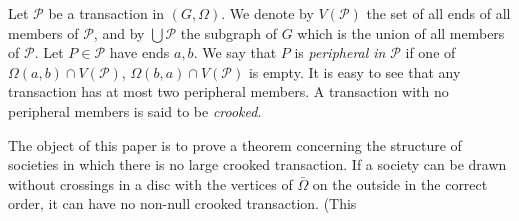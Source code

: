 Let $\mathcal{P}$ be a transaction in $(G, \Omega)$. We denote by $V(\mathcal{P})$ the set of all ends of all members of $\mathcal{P}$, and by $\bigcup \mathcal{P}$ the subgraph of $G$ which is the union of all members of $\mathcal{P}$. Let $P \in \mathcal{P}$ have ends $a, b$. We say that $P$ is \textit{peripheral in} $\mathcal{P}$ if one of $\Omega(a, b) \cap V(\mathcal{P})$, $\Omega(b, a) \cap V(\mathcal{P})$ is empty. It is easy to see that any transaction has at most two peripheral members. A transaction with no peripheral members is said to be \textit{crooked}.

The object of this paper is to prove a theorem concerning the structure of societies in which there is no large crooked transaction. If a society can be drawn without crossings in a disc with the vertices of $\bar{\Omega}$ on the outside in the correct order, it can have no non-null crooked transaction. (This
